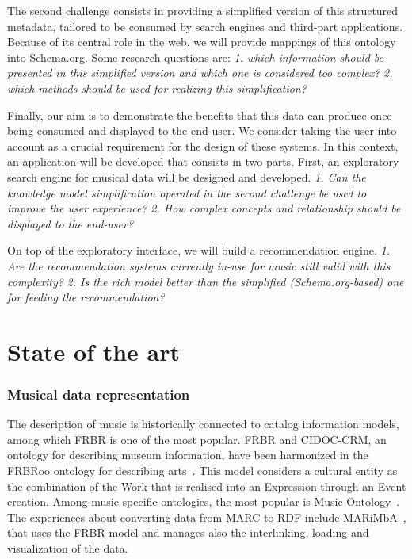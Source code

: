 \documentclass{llncs}
\begin{document}
The second challenge consists in providing a simplified version of this structured metadata, tailored to be consumed by search engines and third-part applications. Because of its central role in the web, we will provide mappings of this ontology into Schema.org. Some research questions are:
\textit{1. which information should be presented in this simplified version and which one is considered too complex?}
\textit{2. which methods should be used for realizing this simplification?}

Finally, our aim is to demonstrate the benefits that this data can produce once being consumed and displayed to the end-user. We consider taking the user into account as a crucial requirement for the design of these systems. In this context, an application will be developed that consists in two parts. First, an exploratory search engine for musical data will be designed and developed.
\textit{1. Can the knowledge model simplification operated in the second challenge be used to improve the user experience?} 
\textit{2. How complex concepts and relationship should be displayed to the end-user?}

On top of the exploratory interface, we will build a recommendation engine.
\textit{1. Are the recommendation systems currently in-use for music still valid with this complexity?}
\textit{2. Is the rich model better than the simplified (Schema.org-based) one for feeding the recommendation?}


\section{State of the art}
\label{sec:state-art}

\subsubsection*{Musical data representation}
The description of music is historically connected to catalog information models, among which FRBR is one of the most popular. FRBR and CIDOC-CRM, an ontology for describing museum information, have been harmonized in the FRBRoo ontology for describing arts~\cite{doerr2008frbroo}. This model considers a cultural entity as the combination of the Work that is realised into an Expression through an Event creation. Among music specific ontologies, the most popular is Music Ontology~\cite{raimond2007music}. The experiences about converting data from MARC to RDF include MARiMbA~\cite{greenberg2013datos}, that uses the FRBR model and manages also  the interlinking, loading and visualization of the data.
\end{document}
